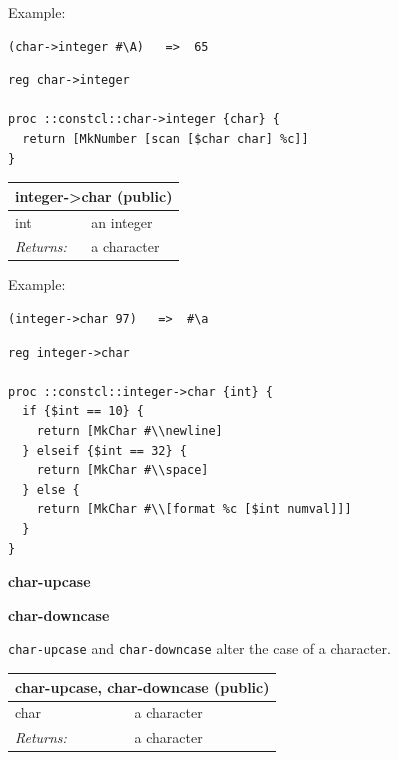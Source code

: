 \documentclass[twoside,9pt]{report}
\begin{document}
Example:

\noindent\makebox[\linewidth]{\rule{\linewidth}{0.4pt}}
\begin{lstlisting}
(char->integer #\A)   =>  65
\end{lstlisting}
\noindent\makebox[\linewidth]{\rule{\linewidth}{0.4pt}}
\noindent\makebox[\linewidth]{\rule{\linewidth}{0.4pt}}
\begin{lstlisting}
reg char->integer
 
proc ::constcl::char->integer {char} {
  return [MkNumber [scan [$char char] %c]]
}
\end{lstlisting}
\noindent\makebox[\linewidth]{\rule{\linewidth}{0.4pt}}
\begin{tabular}{ |l l| }
\hline
\multicolumn{2}{|l|}{integer->char (public)} \\
\hline
int & an integer \\
\textit{Returns:} & a character \\
\hline
\end{tabular}


Example:

\noindent\makebox[\linewidth]{\rule{\linewidth}{0.4pt}}
\begin{lstlisting}
(integer->char 97)   =>  #\a
\end{lstlisting}
\noindent\makebox[\linewidth]{\rule{\linewidth}{0.4pt}}
\noindent\makebox[\linewidth]{\rule{\linewidth}{0.4pt}}
\begin{lstlisting}
reg integer->char
 
proc ::constcl::integer->char {int} {
  if {$int == 10} {
    return [MkChar #\\newline]
  } elseif {$int == 32} {
    return [MkChar #\\space]
  } else {
    return [MkChar #\\[format %c [$int numval]]]
  }
}
\end{lstlisting}
\noindent\makebox[\linewidth]{\rule{\linewidth}{0.4pt}}

\textbf{char-upcase}


\textbf{char-downcase}


\texttt{char-upcase} and \texttt{char-downcase} alter the case of a character.

\begin{tabular}{ |l l| }
\hline
\multicolumn{2}{|l|}{char-upcase, char-downcase (public)} \\
\hline
char & a character \\
\textit{Returns:} & a character \\
\hline
\end{tabular}
\end{document}
